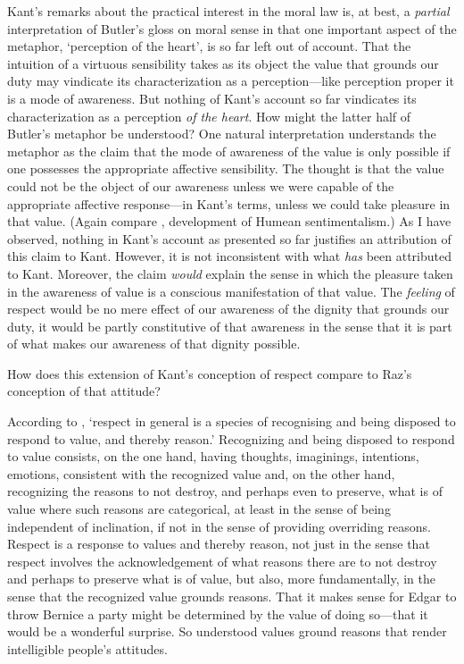 \documentclass[a4paper,12pt]{article}
\begin{document}
Kant's remarks about the practical interest in the moral law is, at best, a \emph{partial} interpretation of Butler's gloss on moral sense in that one important aspect of the metaphor, `perception of the heart', is so far left out of account. That the intuition of a virtuous sensibility takes as its object the value that grounds our duty may vindicate its characterization as a perception---like perception proper it is a mode of awareness. But nothing of Kant's account so far vindicates its characterization as a perception \emph{of the heart}. How might the latter half of Butler's metaphor be understood? One natural interpretation understands the metaphor as the claim that the mode of awareness of the value is only possible if one possesses the appropriate affective sensibility. The thought is that the value could not be the object of our awareness unless we were capable of the appropriate affective response---in Kant's terms, unless we could take pleasure in that value. (Again compare \citealp{Wiggins:1987ta}, development of Humean sentimentalism.) As I have observed, nothing in Kant's account as presented so far justifies an attribution of this claim to Kant. However, it is not inconsistent with what \emph{has} been attributed to Kant. Moreover, the claim \emph{would} explain the sense in which the pleasure taken in the awareness of value is a conscious manifestation of that value. The \emph{feeling} of respect would be no mere effect of our awareness of the dignity that grounds our duty, it would be partly constitutive of that awareness in the sense that it is part of what makes our awareness of that dignity possible. 

How does this extension of Kant's conception of respect compare to Raz's conception of that attitude?

According to \citet[160]{Raz:2001ps}, `respect in general is a species of recognising and being disposed to respond to value, and thereby reason.' Recognizing and being disposed to respond to value consists, on the one hand, having thoughts, imaginings, intentions, emotions, consistent with the recognized value and, on the other hand, recognizing the reasons to not destroy, and perhaps even to preserve, what is of value where such reasons are categorical, at least in the sense of being independent of inclination, if not in the sense of providing overriding reasons. Respect is a response to values and thereby reason, not just in the sense that respect involves the acknowledgement of what reasons there are to not destroy and perhaps to preserve what is of value, but also, more fundamentally, in the sense that the recognized value grounds reasons. That it makes sense for Edgar to throw Bernice a party might be determined by the value of doing so---that it would be a wonderful surprise. So understood values ground reasons that render intelligible people's attitudes. 
\end{document}
